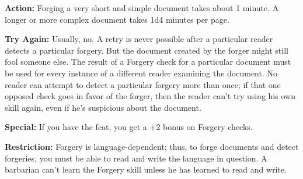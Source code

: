 \textbf{Action:} Forging a very short and simple document takes about 1 minute. 
A longer or more complex document takes 1d4 minutes per page.

\textbf{Try Again:} Usually, no. A retry is never possible after a particular reader 
detects a particular forgery. But the document created by the forger might still 
fool someone else. The result of a Forgery check for a particular document must 
be used for every instance of a different reader examining the document. No reader 
can attempt to detect a particular forgery more than once; if that one opposed 
check goes in favor of the forger, then the reader can't try using his own skill 
again, even if he's suspicious about the document.

\textbf{Special:} If you have the  feat, you get a +2 bonus on Forgery 
checks.

\textbf{Restriction:} Forgery is language-dependent; thus, to forge documents and 
detect forgeries, you must be able to read and write the language in question. 
A barbarian can't learn the Forgery skill unless he has learned to read and write.
